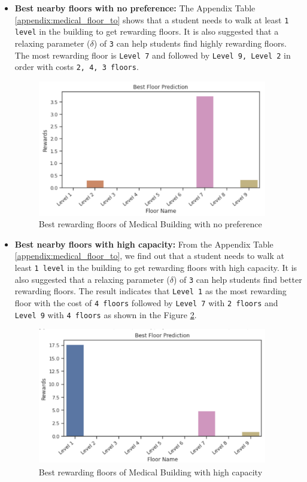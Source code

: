 \begin{itemize}
    \item \textbf{Best nearby floors with no preference:}
    The Appendix Table \ref{appendix:medical_floor_to} shows that a student needs to walk at least \texttt{1 level} in the building to get rewarding floors. It is also suggested that a relaxing parameter ($\delta$) of \texttt{3} can help students find highly rewarding floors. The most rewarding floor is \texttt{Level 7} and followed by \texttt{Level 9, Level 2} in order with costs \texttt{2, 4, 3 floors}.
    \begin{figure}[H]
    \centering
    \includegraphics[width=10cm,keepaspectratio=true]{resources/images/floor_to/medical_no.png}
    \caption{Best rewarding floors of Medical Building with no preference}
    \label{fig:medical_no}
    \end{figure}
    
    \item \textbf{Best nearby floors with high capacity:} From the Appendix Table \ref{appendix:medical_floor_to}, we find out that a student needs to walk at least \texttt{1 level} in the building to get rewarding floors with high capacity. It is also suggested that a relaxing parameter ($\delta$) of \texttt{3} can help students find better rewarding floors. The result indicates that \texttt{Level 1} as the most rewarding floor with the cost of \texttt{4 floors} followed by \texttt{Level 7} with \texttt{2 floors} and \texttt{Level 9} with \texttt{4 floors} as shown in the Figure \ref{fig:medical_highcap}.
    
    \begin{figure}[H]
    \centering
    \includegraphics[width=10cm,keepaspectratio=true]{resources/images/floor_to/medical_highcap.png}
    \caption{Best rewarding floors of Medical Building with high capacity}
    \label{fig:medical_highcap}
    \end{figure}
    

\end{itemize}
